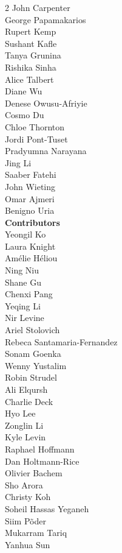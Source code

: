 \begin{multicols}{2}
John Carpenter \\
George Papamakarios \\
Rupert Kemp \\
Sushant Kafle \\
Tanya Grunina \\
Rishika Sinha \\
Alice Talbert \\
Diane Wu \\
Denese Owusu-Afriyie \\
Cosmo Du \\
Chloe Thornton \\
Jordi Pont-Tuset \\
Pradyumna Narayana \\
Jing Li \\
Saaber Fatehi \\
John Wieting \\
Omar Ajmeri \\
Benigno Uria \\
\textbf{Contributors} \\
Yeongil Ko \\
Laura Knight \\
Amélie Héliou \\
Ning Niu \\
Shane Gu \\
Chenxi Pang \\
Yeqing Li \\
Nir Levine \\
Ariel Stolovich \\
Rebeca Santamaria-Fernandez \\
Sonam Goenka \\
Wenny Yustalim \\
Robin Strudel \\
Ali Elqursh \\
Charlie Deck \\
Hyo Lee \\
Zonglin Li \\
Kyle Levin \\
Raphael Hoffmann \\
Dan Holtmann-Rice \\
Olivier Bachem \\
Sho Arora \\
Christy Koh \\
Soheil Hassas Yeganeh \\
Siim Põder \\
Mukarram Tariq \\
Yanhua Sun \\

\end{multicols}
